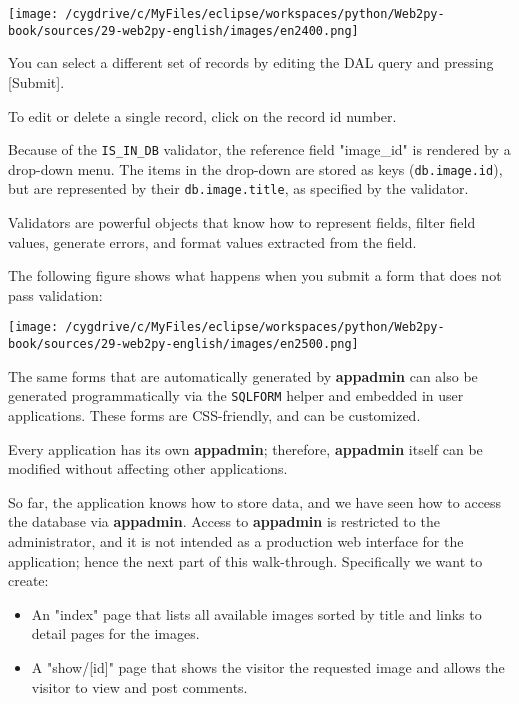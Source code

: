 \documentclass[justified,sixbynine,notoc]{tufte-book}
\def\ft{\small\tt}
\begin{document}
\begin{fullwidth}
\goodbreak\begin{center}\texttt{[image: /cygdrive/c/MyFiles/eclipse/workspaces/python/Web2py-book/sources/29-web2py-english/images/en2400.png]}\end{center}


You can select a different set of records by editing the DAL query and pressing [Submit].

To edit or delete a single record, click on the record id number.

Because of the {\ft IS\_IN\_DB} validator, the reference field "image\_id" is rendered by a drop-down menu. The items in the drop-down are stored as keys ({\ft db.image.id}), but are represented by their {\ft db.image.title}, as specified by the validator.

Validators are powerful objects that know how to represent fields, filter field values, generate errors, and format values extracted from the field.

The following figure shows what happens when you submit a form that does not pass validation:


\goodbreak\begin{center}\texttt{[image: /cygdrive/c/MyFiles/eclipse/workspaces/python/Web2py-book/sources/29-web2py-english/images/en2500.png]}\end{center}


The same forms that are automatically generated by {\bf appadmin} can also be generated programmatically via the {\ft SQLFORM} helper and embedded in user applications. These forms are CSS-friendly, and can be customized.

Every application has its own {\bf appadmin}; therefore, {\bf appadmin} itself can be modified without affecting other applications.

So far, the application knows how to store data, and we have seen how to access the database via {\bf appadmin}. Access to {\bf appadmin} is restricted to the administrator, and it is not intended as a production web interface for the application; hence the next part of this walk-through. Specifically we want to create:
\begin{itemize}
\item An "index" page that lists all available images sorted by title and links to detail pages for the images.

\item A "show/[id]" page that shows the visitor the requested image and allows the visitor to view and post comments.


\end{itemize}
\end{fullwidth}
\end{document}

